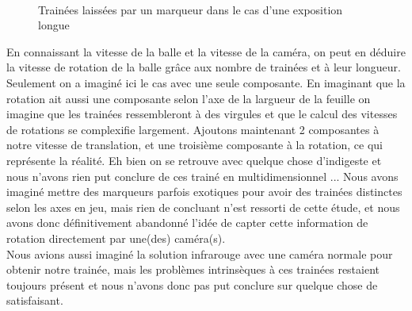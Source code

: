 \begin{figure}
\centering
{}
\\
\caption{Trainées laissées par un marqueur dans le cas d'une exposition longue}
\end{figure}

En connaissant la vitesse de la balle et la vitesse de la caméra, on peut en déduire la vitesse de rotation de la balle grâce aux nombre de trainées et à leur longueur. Seulement on a imaginé ici le cas avec une seule composante. En imaginant que la rotation ait aussi une composante selon l'axe de la largueur de la feuille on imagine que les trainées ressembleront à des virgules et que le calcul des vitesses de rotations se complexifie largement. Ajoutons maintenant 2 composantes à notre vitesse de translation, et une troisième composante à la rotation, ce qui représente la réalité. Eh bien on se retrouve avec quelque chose d'indigeste et nous n'avons rien put conclure de ces trainé en multidimensionnel ... Nous avons imaginé mettre des marqueurs parfois exotiques pour avoir des trainées distinctes selon les axes en jeu, mais rien de concluant n'est ressorti de cette étude, et nous avons donc définitivement abandonné l'idée de capter cette information de rotation directement par une(des) caméra(s).\\

Nous avions aussi imaginé la solution infrarouge avec une caméra normale pour obtenir notre trainée, mais les problèmes intrinsèques à ces trainées restaient toujours présent et nous n'avons donc pas put conclure sur quelque chose de satisfaisant.\\

